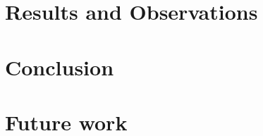 \documentclass[12pt]{report}
\begin{document}
\chapter{Results and Observations}


\chapter{Conclusion}


\chapter{Future work}


\listoffigures
\listoftables

\printbibliography
\end{document}
